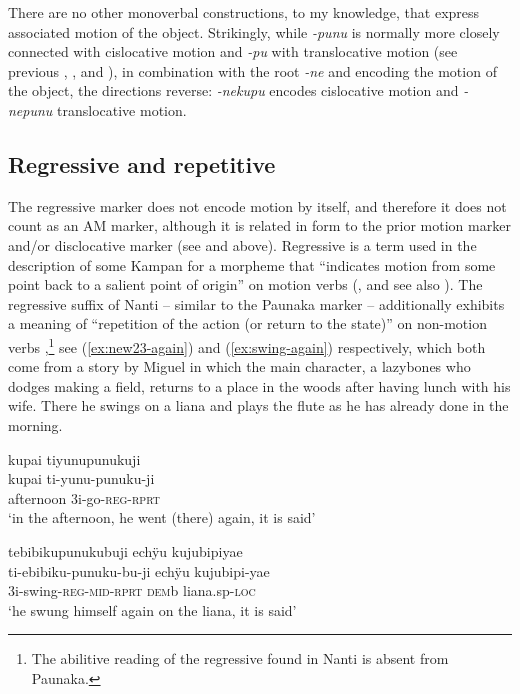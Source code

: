 There are no other monoverbal constructions, to my knowledge, that express associated motion of the object. Strikingly, while \textit{-punu} is normally more closely connected with cislocative motion and \textit{-pu} with translocative motion (see previous , , and ), in combination with the root \textit{-ne} and encoding the motion of the object, the directions reverse: \textit{-nekupu} encodes cislocative motion and \textit{-nepunu} translocative motion.

\subsection{Regressive and repetitive}\label{sec:Repetition}

The regressive marker does not encode motion by itself, and therefore it does not count as an AM marker, although it is related in form to the prior motion marker and/or disclocative marker (see  and  above). Regressive is a term used in the description of some Kampan  for a morpheme that “indicates motion from some point back to a salient point of origin” on motion verbs (\citealt[256]{Michael2008}, and see also \citealt[42]{Payne_et_al1982}). The regressive suffix of Nanti -- similar to the Paunaka marker -- additionally exhibits a meaning of “repetition of the action (or return to the state)” on non-motion verbs \citep[256]{Michael2008},\footnote{The abilitive reading of the regressive found in Nanti \citep[cf.][257]{Michael2008} is absent from Paunaka.} see (\ref{ex:new23-again}) and (\ref{ex:swing-again}) respectively, which both come from a story by Miguel in which the main character, a lazybones who dodges making a field, returns to a place in the woods after having lunch with his wife. There he swings on a liana and plays the flute as he has already done in the morning.

\ea\label{ex:new23-again}
\begingl
\glpreamble kupai tiyunupunukuji\\
\gla kupai ti-yunu-punuku-ji\\
\glb afternoon 3i-go-\textsc{reg}-\textsc{rprt}\\
\glft ‘in the afternoon, he went (there) again, it is said’
\endgl
\trailingcitation{[mox-n110920l.041]}
\xe

\ea\label{ex:swing-again}
\begingl 
\glpreamble tebibikupunukubuji echÿu kujubipiyae\\
\gla ti-ebibiku-punuku-bu-ji echÿu kujubipi-yae\\ 
\glb 3i-swing-\textsc{reg}-\textsc{mid}-\textsc{rprt} \textsc{dem}b liana.sp-\textsc{loc}\\ 
\glft ‘he swung himself again on the liana, it is said’
\trailingcitation{[mox-n110920l.042]}
\xe

